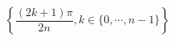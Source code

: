 \begin{displaymath}
 \left\lbrace 
\frac{(2k+1)\pi}{2n}, k\in\{0,\cdots,n-1\}
\right\rbrace 
\end{displaymath}
